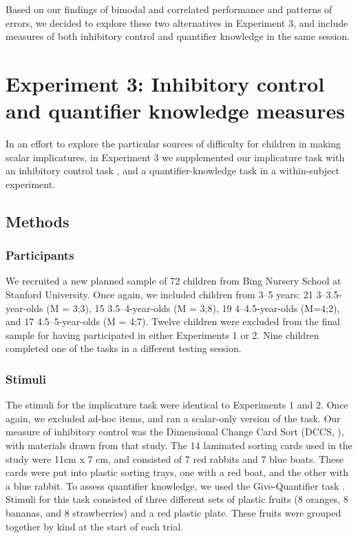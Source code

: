 \documentclass[man]{apa2}
\begin{document}
Based on our findings of bimodal and correlated performance and patterns of errors, we decided to explore these two alternatives in Experiment 3, and include measures of both inhibitory control and quantifier knowledge in the same session. 

				
\section{Experiment 3: Inhibitory control and quantifier knowledge measures}

In an effort to explore the particular sources of difficulty for children in making scalar implicatures, in Experiment 3 we supplemented our implicature task with an inhibitory control task \cite{zelazo2006}, and a quantifier-knowledge task \cite{barner2009} in a within-subject experiment.  

\subsection{Methods}
\subsubsection{Participants} We recruited a new planned sample of 72 children from Bing Nursery School at Stanford University. Once again, we included children from 3--5 years: 21 3--3.5-year-olds (M = 3;3), 15 3.5--4-year-olds (M = 3;8), 19 4--4.5-year-olds (M=4;2), and 17 4.5--5-year-olds (M = 4;7). Twelve children were excluded from the final sample for having participated in either Experiments 1 or 2. Nine children completed one of the tasks in a different testing session. 

\subsubsection{Stimuli} The stimuli for the implicature task were identical to Experiments 1 and 2. Once again, we excluded ad-hoc items, and ran a scalar-only version of the task. Our measure of inhibitory control was the Dimensional Change Card Sort (DCCS, \cite{zelazo2006}), with materials drawn from that study. The 14 laminated sorting cards used in the study were 11cm x 7 cm, and consisted of 7 red rabbits and 7 blue boats. These cards were put into plastic sorting trays, one with a red boat, and the other with a blue rabbit. To assess quantifier knowledge, we used the Give-Quantifier task \cite{barner2009}. Stimuli for this task consisted of three different sets of plastic fruits (8 oranges, 8 bananas, and 8 strawberries) and a red plastic plate. These fruits were grouped together by kind at the start of each trial. 
\end{document}
